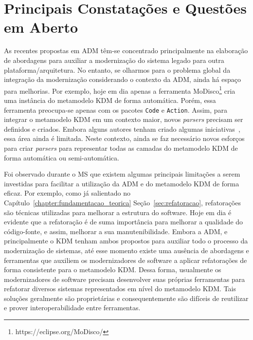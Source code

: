 \section{Principais Constatações e Questões em Aberto}

As recentes propostas em ADM têm-se concentrado principalmente na elaboração de abordagens para auxiliar a modernização do sistema legado para outra plataforma/arquitetura. No entanto, se olharmos para o problema global da integração da modernização considerando o contexto da ADM, ainda há espaço para melhorias. Por exemplo, hoje em dia apenas a ferramenta MoDisco\footnote{https://eclipse.org/MoDisco/} cria uma instância do metamodelo KDM de forma automática. Porém, essa ferramenta preocupa-se apenas com os pacotes \texttt{Code} e \texttt{Action}. Assim, para integrar o metamodelo KDM em um contexto maior, novos \textit{parsers} precisam ser definidos e criados. Embora alguns autores tenham criado algumas iniciativas~\cite{5440163,Bruneliere_2010MODISCO}, essa área ainda é limitada. Neste contexto, ainda se faz necessário novos esforços para criar \textit{parsers} para representar todas as camadas do metamodelo KDM de forma automática ou semi-automática.

Foi observado durante o MS que existem algumas principais limitações a serem investidas para facilitar a utilização da ADM e do metamodelo KDM de forma eficaz. Por exemplo, como já salientado no Capítulo~\ref{chapter:fundamentacao_teorica} Seção~\ref{sec:refatoracao}, refatorações são técnicas utilizadas para melhorar a estrutura do software. Hoje em dia é evidente que a refatoração é de suma importância para melhorar a qualidade do código-fonte, e assim, melhorar a sua manutenibilidade.
Embora a ADM, e principalmente o KDM tenham ambos propostos para auxiliar todo o processo da modernização de sistemas, até esse momento existe uma ausência de abordagens e ferramentas que auxiliem os modernizadores de software a aplicar refatorações de forma consistente para o metamodelo KDM. Dessa forma, usualmente os modernizadores de software precisam desenvolver suas próprias ferramentas para refatorar diversos sistemas representados em nível do metamodelo KDM. Tais soluções geralmente são proprietárias e consequentemente são difíceis de reutilizar e prover interoperabilidade entre ferramentas.

